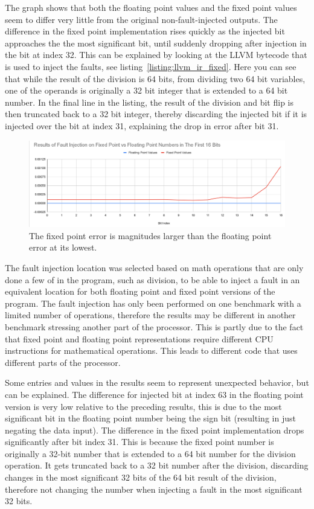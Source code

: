 The graph shows that both the floating point values and the fixed point values seem to differ very little from the original non-fault-injected outputs. The difference in the fixed point implementation rises quickly as the injected bit approaches the the most significant bit, until suddenly dropping after injection in the bit at index 32. This can be explained by looking at the LLVM bytecode that is used to inject the faults, see listing~\ref{listing:llvm_ir_fixed}. Here you can see that while the result of the division is 64 bits, from dividing two 64 bit variables, one of the operands is originally a 32 bit integer that is extended to a 64 bit number. In the final line in the listing, the result of the division and bit flip is then truncated back to a 32 bit integer, thereby discarding the injected bit if it is injected over the bit at index 31, explaining the drop in error after bit 31.

\begin{figure}[h!]
    \centering
    \includegraphics[width=\linewidth]{graph_fault_injection_fix_vs_float_first_16_bits.png}
    \caption{The fixed point error is magnitudes larger than the floating point error at its lowest.}
    \label{fig:graph_fixed_vs_float_error_first_16}
\end{figure}


The fault injection location was selected based on math operations that are only done a few of in the program, such as division, to be able to inject a fault in an equivalent location for both floating point and fixed point versions of the program. The fault injection has only been performed on one benchmark with a limited number of operations, therefore the results may be different in another benchmark stressing another part of the processor. This is partly due to the fact that fixed point and floating point representations require different CPU instructions for mathematical operations. This leads to different code that uses different parts of the processor. 

Some entries and values in the results seem to represent unexpected behavior, but can be explained. The difference for injected bit at index 63 in the floating point version is very low relative to the preceding results, this is due to the most significant bit in the floating point number being the sign bit (resulting in just negating the data input). 
The difference in the fixed point implementation drops significantly after bit index 31. This is because the fixed point number is originally a 32-bit number that is extended to a 64 bit number for the division operation. It gets truncated back to a 32 bit number after the division, discarding changes in the most significant 32 bits of the 64 bit result of the division, therefore not changing the number when injecting a fault in the most significant 32 bits. 

